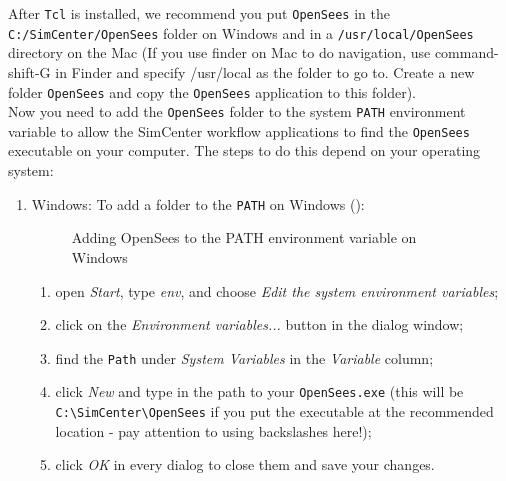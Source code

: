 After \texttt{Tcl} is installed, we recommend you put \texttt{OpenSees} in
the \texttt{C:/SimCenter/OpenSees} folder on Windows and in
a \texttt{/usr/local/OpenSees} directory on the Mac (If you use finder
on Mac to do navigation, use command-shift-G in Finder and specify
/usr/local as the folder to go to. Create a new folder \texttt{OpenSees}
and copy the \texttt{OpenSees} application to this folder).\\


Now you need to add the \texttt{OpenSees} folder to the
system \texttt{PATH} environment variable to allow the SimCenter
workflow applications to find the \texttt{OpenSees} executable on your
computer. The steps to do this depend on your operating system:

\begin{enumerate}
\item Windows: To add a folder to the \texttt{PATH} on Windows ():

\begin{figure}[!htbp]
  \caption{Adding OpenSees to the PATH environment variable on Windows}
  \label{fig:add_env_path}
\end{figure}


\begin{enumerate}
    \item open \emph{Start}, type \emph{env}, and choose \emph{Edit the system environment variables};
    \item click on the \emph{Environment variables...} button in the dialog window;
    \item find the \texttt{Path} under \emph{System Variables} in the \emph{Variable} column;
    \item click \emph{New} and type in the path to your \texttt{OpenSees.exe} (this will be \texttt{C:\textbackslash SimCenter\textbackslash OpenSees} if you put the executable at the recommended location - pay attention to using backslashes here!);
    \item click \emph{OK} in every dialog to close them and save your changes.
\end{enumerate}


\end{enumerate}
